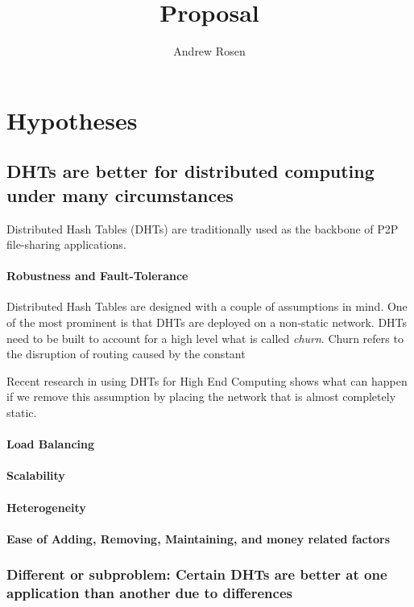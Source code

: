 \documentclass[10pt,letterpaper]{report}
\title{Proposal}
\author{Andrew Rosen}
\begin{document}
\maketitle
\setcounter{tocdepth}{4}
\tableofcontents
\newpage
\chapter{Hypotheses}

\section{DHTs are better for distributed computing under many circumstances}
Distributed Hash Tables (DHTs) are traditionally used as the backbone of P2P file-sharing applications.



\subsubsection{Robustness and Fault-Tolerance}
Distributed Hash Tables are designed with a couple of assumptions in mind.  One of the most prominent is that DHTs are deployed on a non-static network.
DHTs need to be built to account for a high level what is called \textit{churn}.  Churn refers to the disruption of routing caused by the constant 

Recent research in using DHTs for High End Computing \cite{zht} shows what can happen if we remove this assumption by placing the network that is almost completely static.



\subsubsection{Load Balancing}
\subsubsection{Scalability}
\subsubsection{Heterogeneity}
\subsubsection{Ease of Adding, Removing, Maintaining, and money related factors}

\subsection{Different or subproblem: Certain DHTs are better at one application than another due to differences}
\end{document}
